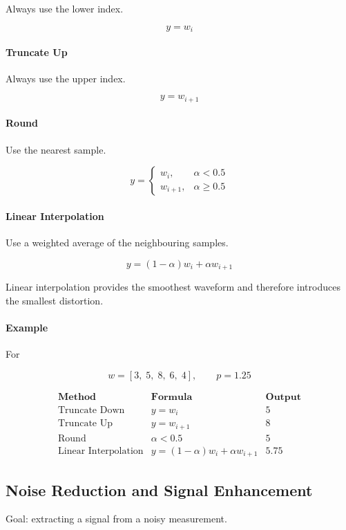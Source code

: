 Always use the lower index.

\[
y=w_i
\]

\paragraph{Truncate Up}

Always use the upper index.

\[
y=w_{i+1}
\]

\paragraph{Round}

Use the nearest sample.

\[
y=
\begin{cases}
w_i,&\alpha<0.5\\
w_{i+1},&\alpha\ge0.5
\end{cases}
\]

\paragraph{Linear Interpolation}

Use a weighted average of the neighbouring samples.

\[
\boxed{
y=(1-\alpha)w_i+\alpha w_{i+1}
}
\]

Linear interpolation provides the smoothest waveform and therefore
introduces the smallest distortion.

\paragraph{Example}

For

\[
w=[3,\;5,\;8,\;6,\;4],
\qquad
p=1.25
\]

\[
\begin{array}{c|c|c}
\textbf{Method} & \textbf{Formula} & \textbf{Output}\\
\hline
\text{Truncate Down}
&
y=w_i
&
5
\\
\text{Truncate Up}
&
y=w_{i+1}
&
8
\\
\text{Round}
&
\alpha<0.5
&
5
\\
\text{Linear Interpolation}
&
y=(1-\alpha)w_i+\alpha w_{i+1}
&
5.75
\end{array}
\]

\subsection{Noise Reduction and Signal Enhancement}
Goal: extracting a signal from a noisy measurement. \\

